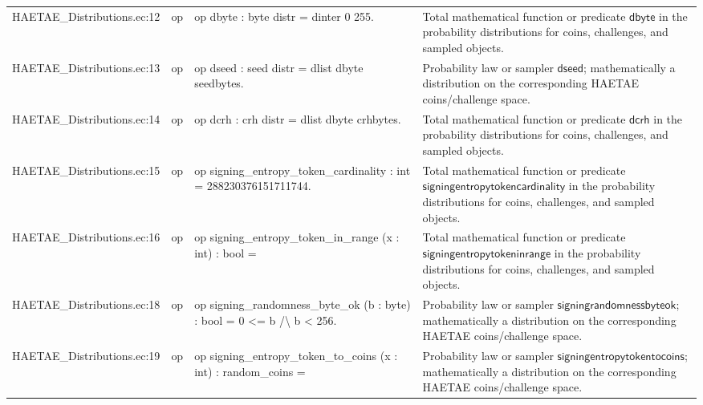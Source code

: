 \documentclass[10pt]{article}
\begin{document}
\begin{longtable}{L{0.11\textwidth}L{0.055\textwidth}L{0.385\textwidth}L{0.41\textwidth}}
HAETAE\_\allowbreak{}Distributions.\allowbreak{}ec:\allowbreak{}12 & op & {\ttfamily\scriptsize op dbyte : byte distr = dinter 0 255.} & Total mathematical function or predicate $\mathsf{dbyte}$ in the probability distributions for coins, challenges, and sampled objects. \\
HAETAE\_\allowbreak{}Distributions.\allowbreak{}ec:\allowbreak{}13 & op & {\ttfamily\scriptsize op dseed : seed distr = dlist dbyte seedbytes.} & Probability law or sampler $\mathsf{dseed}$; mathematically a distribution on the corresponding HAETAE coins/challenge space. \\
HAETAE\_\allowbreak{}Distributions.\allowbreak{}ec:\allowbreak{}14 & op & {\ttfamily\scriptsize op dcrh : crh distr = dlist dbyte crhbytes.} & Total mathematical function or predicate $\mathsf{dcrh}$ in the probability distributions for coins, challenges, and sampled objects. \\
HAETAE\_\allowbreak{}Distributions.\allowbreak{}ec:\allowbreak{}15 & op & {\ttfamily\scriptsize op signing\_\allowbreak{}entropy\_\allowbreak{}token\_\allowbreak{}cardinality : int = 288230376151711744.} & Total mathematical function or predicate $\mathsf{signingentropytokencardinality}$ in the probability distributions for coins, challenges, and sampled objects. \\
HAETAE\_\allowbreak{}Distributions.\allowbreak{}ec:\allowbreak{}16 & op & {\ttfamily\scriptsize op signing\_\allowbreak{}entropy\_\allowbreak{}token\_\allowbreak{}in\_\allowbreak{}range (x : int) : bool =} & Total mathematical function or predicate $\mathsf{signingentropytokeninrange}$ in the probability distributions for coins, challenges, and sampled objects. \\
HAETAE\_\allowbreak{}Distributions.\allowbreak{}ec:\allowbreak{}18 & op & {\ttfamily\scriptsize op signing\_\allowbreak{}randomness\_\allowbreak{}byte\_\allowbreak{}ok (b : byte) : bool = 0 \textless{}= b /\textbackslash{} b \textless{} 256.} & Probability law or sampler $\mathsf{signingrandomnessbyteok}$; mathematically a distribution on the corresponding HAETAE coins/challenge space. \\
HAETAE\_\allowbreak{}Distributions.\allowbreak{}ec:\allowbreak{}19 & op & {\ttfamily\scriptsize op signing\_\allowbreak{}entropy\_\allowbreak{}token\_\allowbreak{}to\_\allowbreak{}coins (x : int) : random\_\allowbreak{}coins =} & Probability law or sampler $\mathsf{signingentropytokentocoins}$; mathematically a distribution on the corresponding HAETAE coins/challenge space. \\

\end{longtable}
\end{document}
